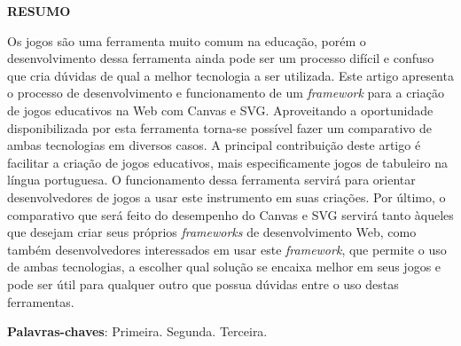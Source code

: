 \vfill
\begin{center}
{\textbf{RESUMO}\\}
\end{center}
\noindent

Os jogos são uma ferramenta muito comum na educação, porém o desenvolvimento dessa ferramenta ainda pode ser um processo difícil e confuso que cria dúvidas de qual a melhor tecnologia a ser utilizada. Este artigo apresenta o processo de desenvolvimento e funcionamento  de um \textit{framework} para a criação de jogos educativos na Web com Canvas e SVG. Aproveitando a oportunidade disponibilizada por esta ferramenta torna-se possível fazer um comparativo de ambas tecnologias em diversos casos. A principal contribuição deste artigo é facilitar a criação de jogos educativos, mais especificamente jogos de tabuleiro na língua portuguesa. O funcionamento dessa ferramenta servirá para orientar desenvolvedores de jogos a usar este instrumento em suas criações. Por último, o comparativo que será feito do desempenho do Canvas e SVG servirá tanto àqueles que desejam criar seus próprios \textit{frameworks} de desenvolvimento Web, como também desenvolvedores interessados em usar este \textit{framework}, que  permite o uso de ambas tecnologias, a escolher qual solução se encaixa melhor em seus jogos e pode ser útil para qualquer outro que possua dúvidas entre o uso destas ferramentas.

\vspace{\onelineskip}
 \noindent
 \textbf{Palavras-chaves}: Primeira. Segunda. Terceira.
